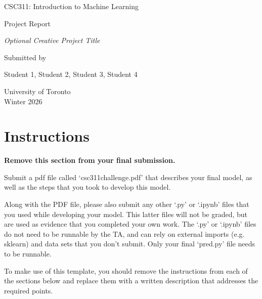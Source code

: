 \documentclass[12pt]{article}
\begin{document}
\begin{titlepage}
    \centering
    \vspace*{3cm}

    {\Large {CSC311: Introduction to Machine Learning} \par}
    \vspace{1cm}
    
    {\Large {Project Report} \par}
    \vspace{1cm}
    
    {\large \textit{Optional Creative Project Title} \par}
    \vspace{3cm}
    
    {\large Submitted by \par}
    
    
    \vspace{0.5cm}
    {\large Student 1, Student 2, Student 3, Student 4 \par}
    
    \vfill
    {\large University of Toronto \\ Winter 2026 \par}
\end{titlepage}
\clearpage
\setcounter{page}{1}

\section{Instructions}

\textbf{Remove this section from your final submission.}

Submit a pdf file called `csc311challenge.pdf' that describes your final model,
as well as the steps that you took to develop this model.

Along with the PDF file,
please also submit any other `.py' or `.ipynb' files that you used while developing
your model. This latter files will not be graded, but are used as evidence that you
completed your own work.
The `.py' or `.ipynb' files do not need to be runnable by the TA, and can rely on
external imports (e.g. sklearn) and data sets that you don't submit.
Only your final `pred.py' file needs to be runnable.

To make use of this template, you should remove the instructions from each of the sections below
and replace them with a written description that addresses the required points.
\end{document}
